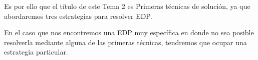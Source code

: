 Es por ello que el título de este Tema 2 es Primeras técnicas de solución, ya que abordaremos tres estrategias para resolver EDP.
\par
En el caso que nos encontremos una EDP muy específica en donde no sea posible resolverla mediante alguna de las primeras técnicas, tendremos que ocupar una estrategia particular.
